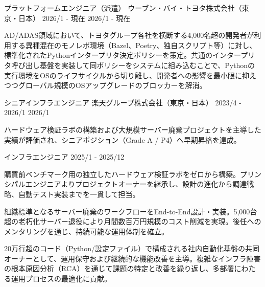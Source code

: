 

\begin{cventries}
  \cventry
    {プラットフォームエンジニア（派遣）} %
    {ウーブン・バイ・トヨタ株式会社（東京・日本）} %
    {2026/1 - 現在} %
    {2026/1 - 現在} %
    { 
      \begin{cvitems}
        \item {AD/ADAS領域において、トヨタグループ各社を横断する4,000名超の開発者が利用する異種混在のモノレポ環境（Bazel、Poetry、独自スクリプト等）に対し、標準化されたPythonインタープリタ決定ポリシーを策定。共通のインタープリタ呼び出し基盤を実装して同ポリシーをシステムに組み込むことで、Pythonの実行環境をOSのライフサイクルから切り離し、開発者への影響を最小限に抑えつつグローバル規模のOSアップグレードのブロッカーを解消。}
      \end{cvitems}
    }

  \cventry
    {シニアインフラエンジニア} %
    {楽天グループ株式会社（東京・日本）} %
    {2023/4 - 2026/1} %
    {2026/1} %
    {
      \begin{cvitems}
        \item {ハードウェア検証ラボの構築および大規模サーバー廃棄プロジェクトを主導した実績が評価され、シニアポジション（Grade A / P4）へ早期昇格を達成。}
      \end{cvitems}
    }
  
  \cventry
    {インフラエンジニア} %
    {} %
    {} %
    {2025/1 - 2025/12} %
    {
      \begin{cvitems}
        \item {購買前ベンチマーク用の独立したハードウェア検証ラボをゼロから構築。プリンシパルエンジニアよりプロジェクトオーナーを継承し、設計の進化から調達戦略、自動テスト実装までを一貫して担当。}
        \item {組織標準となるサーバー廃棄のワークフローをEnd-to-End設計・実装。5,000台超の老朽化サーバー退役により月間数百万円規模のコスト削減を実現。後任へのメンタリングを通じ、持続可能な運用体制を確立。}
        \item {20万行超のコード（Python/設定ファイル）で構成される社内自動化基盤の共同オーナーとして、運用保守および継続的な機能改善を主導。複雑なインフラ障害の根本原因分析（RCA）を通じて課題の特定と改善を繰り返し、多部署にわたる運用プロセスの最適化に貢献。}
      \end{cvitems}
    }
  

\end{cventries}
